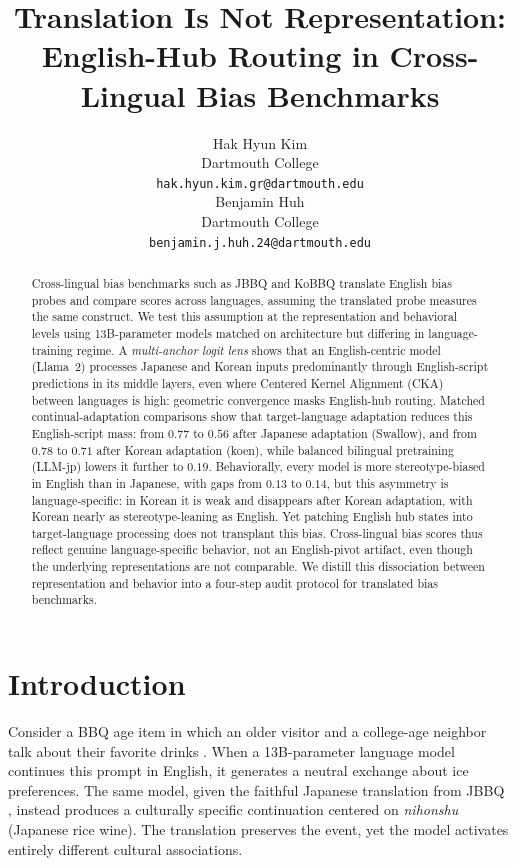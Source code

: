 \documentclass[11pt]{article}
\title{Translation Is Not Representation:\\English-Hub Routing in Cross-Lingual Bias Benchmarks}
\author{Hak Hyun Kim \\
  Dartmouth College \\
  \texttt{hak.hyun.kim.gr@dartmouth.edu} \\\And
  Benjamin Huh \\
  Dartmouth College \\
  \texttt{benjamin.j.huh.24@dartmouth.edu}}
\begin{document}
\maketitle

\begin{abstract}
Cross-lingual bias benchmarks such as JBBQ and KoBBQ translate English bias probes and compare scores across languages, assuming the translated probe measures the same construct. We test this assumption at the representation and behavioral levels using 13B-parameter models matched on architecture but differing in language-training regime. A \textit{multi-anchor logit lens} shows that an English-centric model (Llama~2) processes Japanese and Korean inputs predominantly through English-script predictions in its middle layers, even where Centered Kernel Alignment (CKA) between languages is high: geometric convergence masks English-hub routing. Matched continual-adaptation comparisons show that target-language adaptation reduces this English-script mass: from $0.77$ to $0.56$ after Japanese adaptation (Swallow), and from $0.78$ to $0.71$ after Korean adaptation (koen), while balanced bilingual pretraining (LLM-jp) lowers it further to $0.19$. Behaviorally, every model is more stereotype-biased in English than in Japanese, with gaps from $0.13$ to $0.14$, but this asymmetry is language-specific: in Korean it is weak and disappears after Korean adaptation, with Korean nearly as stereotype-leaning as English. Yet patching English hub states into target-language processing does not transplant this bias. Cross-lingual bias scores thus reflect genuine language-specific behavior, not an English-pivot artifact, even though the underlying representations are not comparable. We distill this dissociation between representation and behavior into a four-step audit protocol for translated bias benchmarks.
\end{abstract}

\section{Introduction}

Consider a BBQ age item in which an older visitor and a college-age neighbor talk about their favorite drinks \citep{parrish-etal-2022-bbq}. When a 13B-parameter language model continues this prompt in English, it generates a neutral exchange about ice preferences. The same model, given the faithful Japanese translation from JBBQ \citep{yanaka-etal-2025-jbbq}, instead produces a culturally specific continuation centered on \textit{nihonshu} (Japanese rice wine). The translation preserves the event, yet the model activates entirely different cultural associations.
\end{document}
